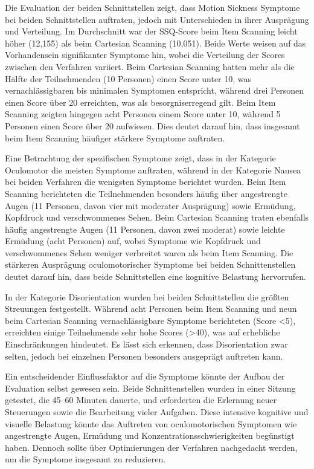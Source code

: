 Die Evaluation der beiden Schnittstellen zeigt, dass Motion Sickness Symptome bei beiden Schnittstellen auftraten, jedoch mit Unterschieden in ihrer Ausprägung und Verteilung. Im Durchschnitt war der SSQ-Score beim Item Scanning leicht höher (12,155) als beim Cartesian Scanning (10,051). Beide Werte weisen auf das Vorhandensein signifikanter Symptome hin, wobei die Verteilung der Scores zwischen den Verfahren variiert. Beim Cartesian Scanning hatten mehr als die Hälfte der Teilnehmenden (10 Personen) einen Score unter 10, was vernachlässigbaren bis minimalen Symptomen entspricht, während drei Personen einen Score über 20 erreichten, was als besorgniserregend gilt. Beim Item Scanning zeigten hingegen acht Personen einem Score unter 10, während 5 Personen einen Score über 20 aufwiesen. Dies deutet darauf hin, dass insgesamt beim Item Scanning häufiger stärkere Symptome auftraten.

Eine Betrachtung der spezifischen Symptome zeigt, dass in der Kategorie Oculomotor die meisten Symptome auftraten, während in der Kategorie Nausea bei beiden Verfahren die wenigsten Symptome berichtet wurden. Beim Item Scanning berichteten die Teilnehmenden besonders häufig über angestrengte Augen (11 Personen, davon vier mit moderater Ausprägung) sowie Ermüdung, Kopfdruck und verschwommenes Sehen. Beim Cartesian Scanning traten ebenfalls häufig angestrengte Augen (11 Personen, davon zwei moderat) sowie leichte Ermüdung (acht Personen) auf, wobei Symptome wie Kopfdruck und verschwommenes Sehen weniger verbreitet waren als beim Item Scanning. Die stärkeren Ausprägung oculomotorischer Symptome bei beiden Schnittenstellen deutet darauf hin, dass beide Schnittstellen eine kognitive Belastung hervorrufen. 

In der Kategorie Disorientation wurden bei beiden Schnittstellen die größten Streuungen festgestellt. Während acht Personen beim Item Scanning und neun beim Cartesian Scanning vernachlässigbare Symptome berichteten (Score <5), erreichten einige Teilnehmende sehr hohe Scores (>40), was auf erhebliche Einschränkungen hindeutet. Es lässt sich erkennen, dass Disorientation zwar selten, jedoch bei einzelnen Personen besonders ausgeprägt auftreten kann.

Ein entscheidender Einflussfaktor auf die Symptome könnte der Aufbau der Evaluation selbst gewesen sein. Beide Schnittenstellen wurden in einer Sitzung getestet, die 45–60 Minuten dauerte, und erforderten die Erlernung neuer Steuerungen sowie die Bearbeitung vieler Aufgaben. Diese intensive kognitive und visuelle Belastung könnte das Auftreten von oculomotorischen Symptomen wie angestrengte Augen, Ermüdung und Konzentrationsschwierigkeiten begünstigt haben. Dennoch sollte über Optimierungen der Verfahren nachgedacht werden, um die Symptome insgesamt zu reduzieren.

